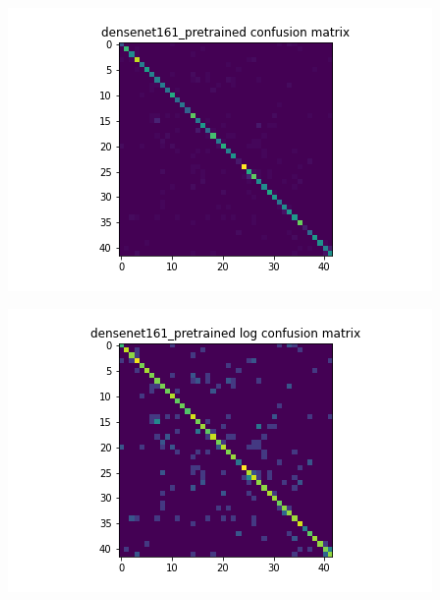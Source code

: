 \begin{figure}[H]
  \begin{minipage}[b]{.5\linewidth}
    \centering
    {\includegraphics[width=1.2\textwidth]{figs/conf_matrix/densenet161_pretrained_conf.png}}
  \end{minipage}
  \hfill
  \begin{minipage}[b]{.5\linewidth}
    \centering

    {\includegraphics[width=1.2\textwidth]{figs/conf_matrix/densenet161_pretrained_log_conf.png}}
  \end{minipage}
  \vfill
  \begin{minipage}[b]{.5\linewidth}
    \centering


\end{minipage}
\end{figure}
